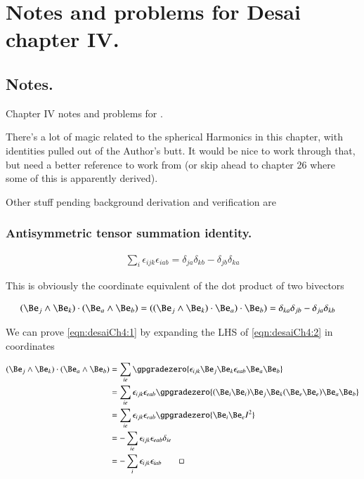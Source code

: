 %
%

\chapter{Notes and problems for Desai chapter IV.}
\label{chap:desaiCh4}
{}
\date{Oct 10, 2010}

\beginArtWithToc

\section{Notes.}

Chapter IV notes and problems for \citep{desai2009quantum}.

There's a lot of magic related to the spherical Harmonics in this chapter, with identities pulled out of the Author's butt.  It would be nice to work through that, but need a better reference to work from (or skip ahead to chapter 26 where some of this is apparently derived).

Other stuff pending background derivation and verification are

\subsection{Antisymmetric tensor summation identity.}

\begin{align}\label{eqn:desaiCh4:1}
\sum_i \epsilon_{ijk} \epsilon_{iab} = \delta_{ja} \delta_{kb} - \delta_{jb}\delta_{ka}
\end{align}

This is obviously the coordinate equivalent of the dot product of two bivectors

\begin{align}\label{eqn:desaiCh4:2}
(\Be_j \wedge \Be_k) \cdot (\Be_a \wedge \Be_b) &=
( (\Be_j \wedge \Be_k) \cdot \Be_a ) \cdot \Be_b) =
\delta_{ka}\delta_{jb} - \delta_{ja}\delta_{kb}
\end{align}

We can prove \ref{eqn:desaiCh4:1} by expanding the LHS of \ref{eqn:desaiCh4:2} in coordinates

\begin{align*}
(\Be_j \wedge \Be_k) \cdot (\Be_a \wedge \Be_b)
&= \sum_{ie} \gpgradezero{
\epsilon_{ijk} \Be_j \Be_k \epsilon_{eab} \Be_a \Be_b
} \\
&=
\sum_{ie}
\epsilon_{ijk} \epsilon_{eab}
\gpgradezero{
(\Be_i \Be_i) \Be_j \Be_k (\Be_e \Be_e) \Be_a \Be_b
} \\
&=
\sum_{ie}
\epsilon_{ijk} \epsilon_{eab}
\gpgradezero{
\Be_i \Be_e I^2
} \\
&=
-\sum_{ie} \epsilon_{ijk} \epsilon_{eab} \delta_{ie} \\
&=
-
\sum_i
\epsilon_{ijk} \epsilon_{iab}
\qquad\square
\end{align*}

